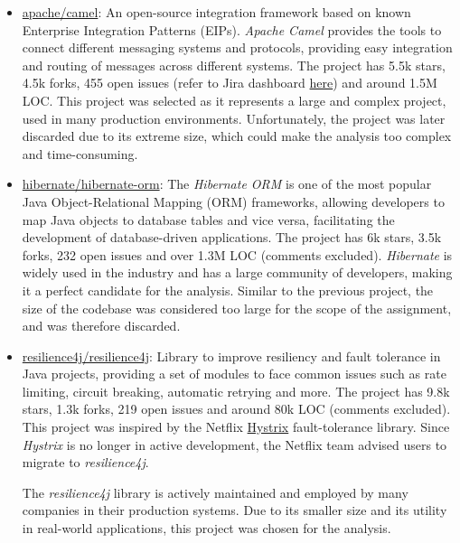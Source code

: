 \begin{itemize}
	\item \href{https://github.com/apache/camel}{apache/camel}: An open-source integration framework based on known Enterprise Integration Patterns (EIPs). \cite{camel:description} \textit{Apache Camel} provides the tools to connect different messaging systems and protocols, providing easy integration and routing of messages across different systems. The project has 5.5k stars, 4.5k forks, 455 open issues (refer to Jira dashboard \href{https://issues.apache.org/jira/projects/CAMEL/issues/CAMEL-21410?filter=allopenissues}{here}) and around 1.5M LOC. This project was selected as it represents a large and complex project, used in many production environments.
	      Unfortunately, the project was later discarded due to its extreme size, which could make the analysis too complex and time-consuming.

	\item \href{https://github.com/hibernate/hibernate-orm}{hibernate/hibernate-orm}: The \textit{Hibernate ORM} is one of the most popular Java Object-Relational Mapping (ORM) frameworks, allowing developers to map Java objects to database tables and vice versa, facilitating the development of database-driven applications. The project has 6k stars, 3.5k forks, 232 open issues and over 1.3M LOC (comments excluded). \textit{Hibernate} is widely used in the industry and has a large community of developers, making it a perfect candidate for the analysis.
	      Similar to the previous project, the size of the codebase was considered too large for the scope of the assignment, and was therefore discarded.

	\item \href{https://github.com/resilience4j/resilience4j}{resilience4j/resilience4j}: Library to improve resiliency and fault tolerance in Java projects, providing a set of modules to face common issues such as rate limiting, circuit breaking, automatic retrying and more. The project has 9.8k stars, 1.3k forks, 219 open issues and around 80k LOC (comments excluded). This project was inspired by the Netflix \href{https://github.com/Netflix/Hystrix}{Hystrix} fault-tolerance library. Since \textit{Hystrix} is no longer in active development, the Netflix team advised users to migrate to \textit{resilience4j}. \cite{hystrix:readme}

	      The \textit{resilience4j} library is actively maintained and employed by many companies in their production systems. Due to its smaller size and its utility in real-world applications, this project was chosen for the analysis.

\end{itemize}


